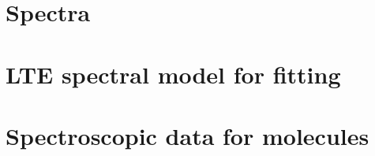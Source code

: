 \documentclass[linenumbers, twocolumn, times]{aastex631}
\begin{document}

\software{\textcolor{red}{software references here}}



\appendix

\section{Spectra}

\section{LTE spectral model for fitting}

\section{Spectroscopic data for molecules}






{}



\end{document}
